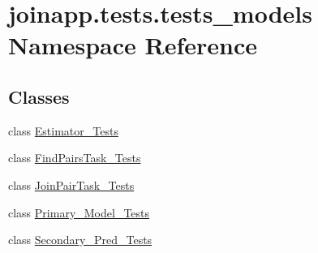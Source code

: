 \hypertarget{namespacejoinapp_1_1tests_1_1tests__models}{}\section{joinapp.\+tests.\+tests\+\_\+models Namespace Reference}
\label{namespacejoinapp_1_1tests_1_1tests__models}
\subsection*{Classes}
\begin{DoxyCompactItemize}
\item 
class \mbox{\hyperlink{classjoinapp_1_1tests_1_1tests__models_1_1_estimator___tests}{Estimator\+\_\+\+Tests}}
\item 
class \mbox{\hyperlink{classjoinapp_1_1tests_1_1tests__models_1_1_find_pairs_task___tests}{Find\+Pairs\+Task\+\_\+\+Tests}}
\item 
class \mbox{\hyperlink{classjoinapp_1_1tests_1_1tests__models_1_1_join_pair_task___tests}{Join\+Pair\+Task\+\_\+\+Tests}}
\item 
class \mbox{\hyperlink{classjoinapp_1_1tests_1_1tests__models_1_1_primary___model___tests}{Primary\+\_\+\+Model\+\_\+\+Tests}}
\item 
class \mbox{\hyperlink{classjoinapp_1_1tests_1_1tests__models_1_1_secondary___pred___tests}{Secondary\+\_\+\+Pred\+\_\+\+Tests}}
\end{DoxyCompactItemize}

